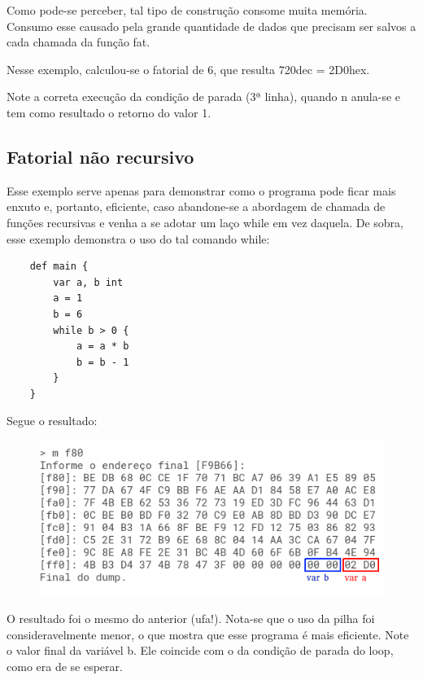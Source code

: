 \documentclass[a4paper,12pt]{report}
\begin{document}
    Como pode-se perceber, tal tipo de construção consome muita memória. Consumo esse causado pela grande quantidade de dados que precisam ser salvos a cada chamada da função fat.

    Nesse exemplo, calculou-se o fatorial de 6, que resulta 720dec = 2D0hex.

    Note a correta execução da condição de parada (3ª linha), quando n anula-se e tem como resultado o retorno do valor 1.
    
    \subsection*{Fatorial não recursivo}
    Esse exemplo serve apenas para demonstrar como o programa pode ficar mais enxuto e, portanto, eficiente, caso abandone-se a abordagem de chamada de funções recursivas e venha a se adotar um laço while em vez daquela. De sobra, esse exemplo demonstra o uso do tal comando while:

    \begin{lstlisting}
    def main {
        var a, b int
        a = 1
        b = 6
        while b > 0 {
            a = a * b
            b = b - 1
        }
    }
    \end{lstlisting}

    Segue o resultado:

    \begin{figure}[h]
        \centering
        \includegraphics[scale=0.65]{fat_while}
    \end{figure}

    O resultado foi o mesmo do anterior (ufa!). Nota-se que o uso da pilha foi consideravelmente menor, o que mostra que esse programa é mais eficiente. Note o valor final da variável b. Ele coincide com o da condição de parada do loop, como era de se esperar.
    
    
\end{document}
